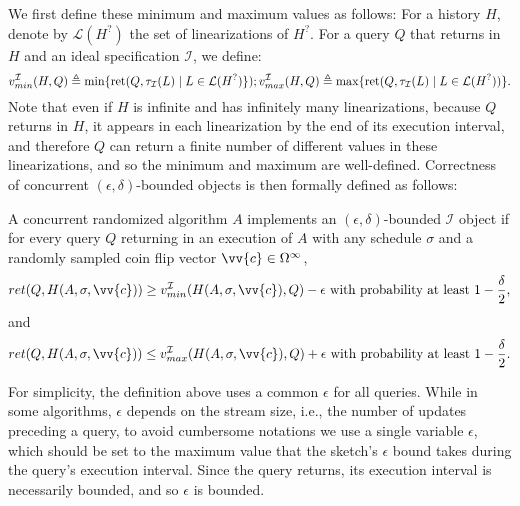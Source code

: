 We first define these minimum and maximum values as follows: For a history $H$,
denote by $\mathcal{L}(H^?)$ the set of linearizations of $H^?$.
For a query $Q$ that returns in $H$ and an ideal specification $\mathcal{I}$, we define: 
$$ v^{\mathcal{I}}_{min}(H,Q) \triangleq \min \{ \text{ret}(Q,\tau_\mathcal{I}(L) \mid L \in \mathcal{L}(H^?)\}) ; \\
v^{\mathcal{I}}_{max}(H,Q) \triangleq \max \{ \text{ret}(Q,\tau_\mathcal{I}(L) \mid L \in \mathcal{L}(H^?))\}.
$$
Note that even if $H$ is infinite and has infinitely many linearizations,
because $Q$ returns in $H$, it appears in each linearization by
the end of its execution interval, and therefore $Q$ can return a finite number of different
values in these linearizations, and so the minimum and maximum are well-defined.
Correctness of concurrent $(\epsilon, \delta)$-bounded objects is then formally defined as follows:

\begin{definition}
    A concurrent randomized algorithm $A$ implements an $(\epsilon,\delta)$-bounded
    $\mathcal{I}$ object if for every query $Q$ returning in
    an execution of $A$ with any schedule $\sigma$ and a randomly sampled
    coin flip vector $\vv{c} \in \Omega^\infty$,
    $$ ret(Q,H(A,\sigma,\vv{c})) \geq  v^{\mathcal{I}}_{min}(H(A,\sigma,\vv{c}),Q) - \epsilon \text{ with probability at least } 1-\frac{\delta}{2}, $$
    and 
    $$ ret(Q,H(A,\sigma,\vv{c})) \leq v^{\mathcal{I}}_{max}(H(A,\sigma,\vv{c}),Q) + \epsilon \text{ with probability at least } 1-\frac{\delta}{2}.$$
    \label{ivl-def:con-e,d-obj}
\end{definition} 
    
For simplicity, the definition above uses a common $\epsilon$ for all queries.
While in some algorithms, $\epsilon$ depends on the stream size, i.e.,
the number of updates preceding a query, to avoid cumbersome notations we use
a single variable $\epsilon$, which should be set to the maximum
value that the sketch's $\epsilon$ bound takes during the query's execution interval.
Since the query returns, its execution interval is necessarily bounded, and so
$\epsilon$ is bounded.

